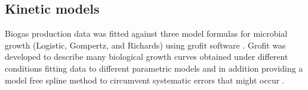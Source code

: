 \subsection{Kinetic models}
Biogas production data was fitted against three model formulas for microbial growth (Logistic, Gompertz, and Richards) using grofit software \cite{Kahm_2010}. Grofit was developed to describe many biological growth curves obtained under different conditions fitting data to different parametric models and in addition providing a model free spline method to circumvent systematic errors that might
occur \cite{Kahm_2010}.